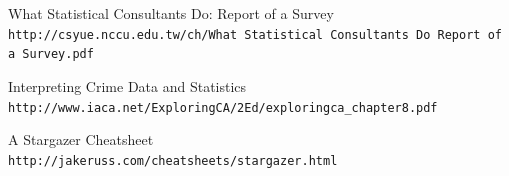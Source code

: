 \documentclass[preprint,12pt,3p]{elsarticle}
\begin{document}
\begin{thebibliography}{25}
What Statistical Consultants Do: Report of a Survey\\
\texttt{http://csyue.nccu.edu.tw/ch/What Statistical Consultants Do Report of a Survey.pdf}

Interpreting Crime Data and Statistics\\
\texttt{http://www.iaca.net/ExploringCA/2Ed/exploringca\_chapter8.pdf}

A Stargazer Cheatsheet\\
\texttt{http://jakeruss.com/cheatsheets/stargazer.html}

\end{thebibliography}









% 
% 
% 
% 
% 
% 
% 
% 
% 
% 
% 
% 


\end{document}
